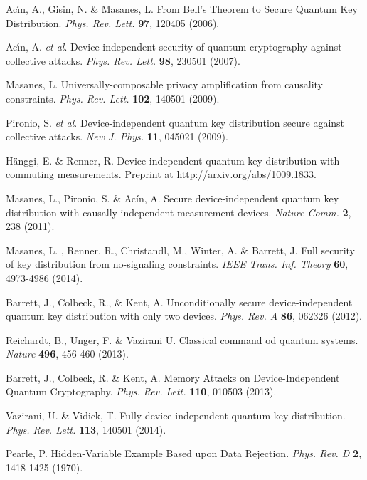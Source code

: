 \documentclass[11pt,a4paper]{article}
\begin{document}
{\begin{thebibliography}{99}
 Ac\'{\i}n, A., Gisin, N. \& Masanes, L. From Bell's Theorem to Secure Quantum Key Distribution. \textit{Phys. Rev. Lett.} {\bf 97}, 120405 (2006).

Ac\'\i n, A. {\em et al}.
Device-independent security of quantum cryptography against collective attacks. \textit{Phys. Rev. Lett.} \textbf{98}, 230501
(2007).

 Masanes, L. Universally-composable privacy amplification from causality constraints. \textit{Phys. Rev. Lett.} \textbf{102}, 140501 (2009).


Pironio, S. {\em et al}.
Device-independent quantum key distribution secure against collective attacks. \textit{New J. Phys.} \textbf{11}, 045021
(2009).

H\"anggi, E. \& Renner, R. Device-independent quantum key distribution with commuting measurements. Preprint at http://arxiv.org/abs/1009.1833.

 Masanes, L., Pironio,  S. \& Ac{\'i}n, A. Secure device-independent quantum key distribution with causally independent measurement devices. \textit{Nature Comm.} {\bf 2}, 238 (2011).

Masanes, L. , Renner, R., Christandl, M., Winter, A. \& Barrett, J. Full security of key distribution from no-signaling constraints. \textit{IEEE Trans. Inf. Theory} {\bf 60}, 4973-4986 (2014).

Barrett, J., Colbeck, R., \& Kent, A. Unconditionally secure device-independent quantum key distribution with only two devices. \textit{Phys. Rev. A} \textbf{86}, 062326 (2012).

Reichardt, B., Unger, F. \& Vazirani U. Classical command od quantum systems. \textit{Nature} \textbf{496}, 456-460 (2013).

Barrett, J., Colbeck, R. \& Kent, A. Memory Attacks on Device-Independent Quantum Cryptography. \textit{Phys. Rev. Lett.} {\bf 110}, 010503 (2013).

Vazirani, U. \& Vidick, T. Fully device independent quantum key distribution. \textit{Phys. Rev. Lett.} \textbf{113}, 140501 (2014).


Pearle, P.  Hidden-Variable Example Based upon Data Rejection. \textit{Phys. Rev. D} \textbf{2}, 1418-1425 (1970).


\end{thebibliography}}
\end{document}
